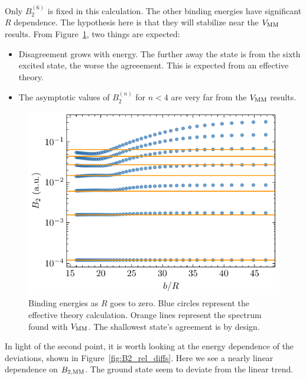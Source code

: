 \documentclass{article}
\begin{document}
Only $B_2^{(6)}$ is fixed in this calculation.
The other binding energies have significant $R$ dependence.
The hypothesis here is that they will stabilize near the $V_{\rm MM}$ results.
From Figure~\ref{fig:B2s}, two things are expected:
\begin{itemize}
  \item Disagreement grows with energy. The further away the state is from the
    sixth excited state, the worse the agreeement. This is expected from an
    effective theory.
  \item The asymptotic values of $B_2^{(n)}$ for $n<4$ are very far from the $V_{\rm
    MM}$ results.
\end{itemize}

\begin{figure}
  \centering
  \includegraphics{figures/B2s.pdf}
  \caption{Binding energies as $R$ goes to zero. Blue circles represent the
    effective theory calculation. Orange lines represent the spectrum found with
  $V_{\rm MM}$. The shallowest state's agreement is by design.}\label{fig:B2s}
\end{figure}


In light of the second point, it is worth looking at the energy dependence of
the deviations, shown in Figure~\ref{fig:B2_rel_diffs}.
Here we see a nearly linear dependence on $B_{2,{\rm MM}}$.
The ground state seem to deviate from the linear trend.
\end{document}
